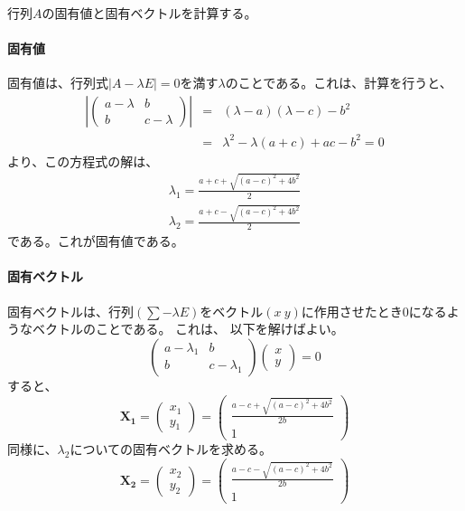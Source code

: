 行列$A$の固有値と固有ベクトルを計算する。
\paragraph{固有値}
固有値は、行列式$|A-\lambda E|=0$を満す$\lambda$のことである。これは、計算を行うと、
\begin{eqnarray*}
 \left|\begin{pmatrix}
  a-\lambda & b\\
  b & c-\lambda
  \end{pmatrix}\right| &=& (\lambda-a)(\lambda -c)-b^2 \\
 &=& \lambda^2-\lambda(a+c)+ac-b^2 =0
\end{eqnarray*}
より、この方程式の解は、
\begin{eqnarray*}
 \lambda_1 = \frac{a+c+\sqrt{(a-c)^2+4b^2}}{2} \\
 \lambda_2 = \frac{a+c-\sqrt{(a-c)^2+4b^2}}{2}
\end{eqnarray*}
である。これが固有値である。

\paragraph{固有ベクトル}
固有ベクトルは、行列$(\sum-\lambda E)$をベクトル$(x\ y)$に作用させたとき$0$になるようなベクトルのことである。
これは、
以下を解けばよい。
\begin{equation*}
 \begin{pmatrix}
  a-\lambda_1 & b  \\
 b 
& c-\lambda_1
 \end{pmatrix}
\begin{pmatrix}
 x\\
 y
\end{pmatrix}=0
\end{equation*}
すると、
\begin{equation*}
 \bm{X_1} = \begin{pmatrix}
  x_1 \\
  y_1
 \end{pmatrix} =
\begin{pmatrix}
 \frac{a-c+\sqrt{(a-c)^2+4b^2}}{2b}\\
 1
\end{pmatrix}
\end{equation*}
同様に、$\lambda_2$についての固有ベクトルを求める。
\begin{equation*}
 \bm{X_2}=\begin{pmatrix}
  x_2 \\
  y_2
 \end{pmatrix} =
\begin{pmatrix}
 \frac{ a-c-\sqrt{(a-c)^2+4b^2} }{2b}\\
 1
\end{pmatrix}
\end{equation*}


